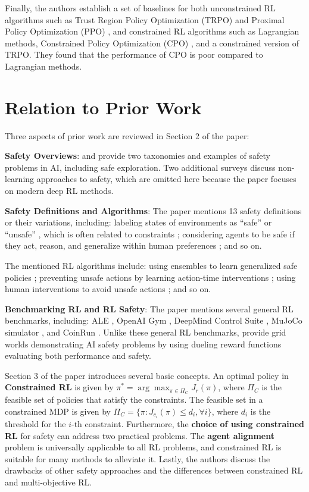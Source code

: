 \documentclass{article}
\begin{document}
Finally, the authors establish a set of baselines for both unconstrained RL algorithms such as Trust Region Policy Optimization (TRPO) \cite{schulman2015trust} and Proximal Policy Optimization (PPO) \cite{schulman2017proximal}, and constrained RL algorithms such as Lagrangian methods, Constrained Policy Optimization (CPO) \cite{achiam2017constrained}, and a constrained version of TRPO. They found that the performance of CPO is poor compared to Lagrangian methods.

\section{Relation to Prior Work}

Three aspects of prior work are reviewed in Section 2 of the paper:

\textbf{Safety Overviews}: \citet{amodei2016concrete} and \citet{leike2017ai} provide two taxonomies and examples of safety problems in AI, including safe exploration. Two additional surveys discuss non-learning approaches to safety, which are omitted here because the paper focuses on modern deep RL methods.

\textbf{Safety Definitions and Algorithms}: The paper mentions 13 safety definitions or their variations, including: labeling states of environments as ``safe'' or ``unsafe'' \cite{hans2008safe}, which is often related to constraints \cite{haviv1996constrained}; considering agents to be safe if they act, reason, and generalize within human preferences \cite{hadfield2016cooperative, christiano2017deep, irving2018ai, leike2018scalable}; and so on.

The mentioned RL algorithms include: using ensembles to learn generalized safe policies \cite{kenton2019generalizing}; preventing unsafe actions by learning action-time interventions \cite{dalal2018safe, chow2019lyapunov}; using human interventions to avoid unsafe actions \cite{saunders2017trial}; and so on.

\textbf{Benchmarking RL and RL Safety}: The paper mentions several general RL benchmarks, including: ALE \cite{bellemare2013arcade}, OpenAI Gym \cite{brockman2016openai}, DeepMind Control Suite \cite{tassa2018deepmind}, MuJoCo simulator \cite{todorov2012mujoco}, and CoinRun \cite{cobbe2019quantifying}. Unlike these general RL benchmarks, \citet{leike2017ai} provide grid worlds demonstrating AI safety problems by using dueling reward functions evaluating both performance and safety.

Section 3 of the paper introduces several basic concepts. An optimal policy in \textbf{Constrained RL} is given by $\pi^* = \arg\max_{\pi\in\Pi_C} J_r(\pi)$, where $\Pi_C$ is the feasible set of policies that satisfy the constraints. The feasible set in a constrained MDP is given by $\Pi_C = \{\pi: J_{c_i}(\pi) \leq d_i, \forall i\}$, where $d_i$ is the threshold for the $i$-th constraint. Furthermore, the \textbf{choice of using constrained RL} for safety can address two practical problems. The \textbf{agent alignment} problem is universally applicable to all RL problems, and constrained RL is suitable for many methods to alleviate it. Lastly, the authors discuss the drawbacks of other safety approaches and the differences between constrained RL and multi-objective RL.
\end{document}
